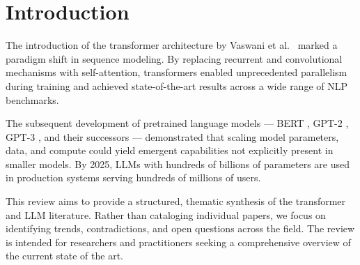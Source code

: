 \documentclass[
    language=english,
    doctype=review-article,
    institution=none,
]{../../omnilatex}
\begin{document}
\maketitle

\begin{abstract}
Transformer-based large language models (LLMs) have fundamentally reshaped
the landscape of natural language processing (NLP) and are increasingly
influencing computer vision, robotics, and scientific discovery. This
comprehensive review examines the architectural innovations, training
methodologies, and application domains that have defined the transformer
era from 2017 through mid-2025. We organize the literature thematically
around six core topics: (1) the original transformer architecture and
its variants, (2) pretraining objectives and scaling laws, (3) alignment
and fine-tuning techniques, (4) efficiency and deployment optimizations,
(5) multimodal extensions, and (6) safety, ethics, and societal impact.
For each theme, we synthesize findings from over 400 papers, identify
key open problems, and outline future research directions. Our analysis
reveals that while scaling continues to yield performance improvements,
fundamental challenges in reasoning, factual grounding, and alignment
remain largely unsolved.
\end{abstract}

\section{Introduction}
\label{sec:introduction}

The introduction of the transformer architecture by Vaswani et al.\
\cite{vaswani2017attention} marked a paradigm shift in sequence modeling.
By replacing recurrent and convolutional mechanisms with self-attention,
transformers enabled unprecedented parallelism during training and achieved
state-of-the-art results across a wide range of NLP benchmarks.

The subsequent development of pretrained language models --- BERT \cite{devlin2018bert},
GPT-2 \cite{radford2019language}, GPT-3 \cite{brown2020language}, and their
successors --- demonstrated that scaling model parameters, data, and compute
could yield emergent capabilities not explicitly present in smaller models.
By 2025, LLMs with hundreds of billions of parameters are used in production
systems serving hundreds of millions of users.

This review aims to provide a structured, thematic synthesis of the
transformer and LLM literature. Rather than cataloging individual papers,
we focus on identifying trends, contradictions, and open questions across
the field. The review is intended for researchers and practitioners seeking
a comprehensive overview of the current state of the art.
\end{document}
